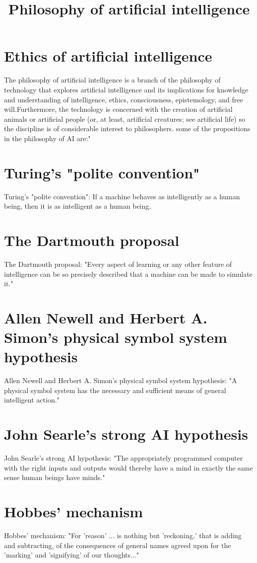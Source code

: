\documentclass[10pts]{article}
\begin{document}
\title{Philosophy of artificial intelligence}
\maketitle
\section{ Ethics of artificial intelligence}
The philosophy of artificial intelligence is a branch of the philosophy of technology that explores artificial intelligence and its implications for knowledge and understanding of intelligence, ethics, consciousness, epistemology, and free will.Furthermore, the technology is concerned with the creation of artificial animals or artificial people (or, at least, artificial creatures; see artificial life) so the discipline is of considerable interest to philosophers. some of the propositions in the philosophy of AI are:"
\section{Turing's "polite convention"}
Turing's "polite convention": If a machine behaves as intelligently as a human being, then it is as intelligent as a human being.\\
\section{The Dartmouth proposal}
The Dartmouth proposal: "Every aspect of learning or any other feature of intelligence can be so precisely described that a machine can be made to simulate it."\\
\section{Allen Newell and Herbert A. Simon's physical symbol system hypothesis}
Allen Newell and Herbert A. Simon's physical symbol system hypothesis: "A physical symbol system has the necessary and sufficient means of general intelligent action."\\
\section{John Searle's strong AI hypothesis}
John Searle's strong AI hypothesis: "The appropriately programmed computer with the right inputs and outputs would thereby have a mind in exactly the same sense human beings have minds."\\
\section{Hobbes' mechanism}
Hobbes' mechanism: "For 'reason' ... is nothing but 'reckoning,' that is adding and subtracting, of the consequences of general names agreed upon for the 'marking' and 'signifying' of our thoughts..."\\
\end{document}
